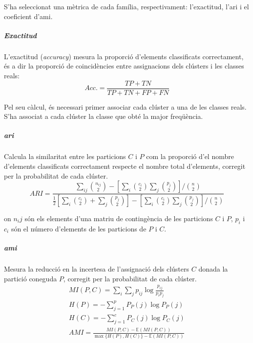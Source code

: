 \documentclass[CAT,BIB]{TFUOC}%
\begin{document}
            S'ha seleccionat una mètrica de cada família, respectivament:
            l'exactitud, l'\gls{ari} i el coeficient d'\gls{ami}.

            \subparagraph{Exactitud}
                L'exactitud (\textit{accuracy})
                mesura la proporció d'elements classificats correctament,
                és a dir la proporció de coincidències
                entre assignacions dels clústers i les classes reals:
                \begin{equation}
                \label{eq:accuracy}
                    Acc. = \frac{TP + TN}{TP + TN + FP + FN}
                \end{equation}

                Pel seu càlcul,
                és necessari primer associar cada clúster
                a una de les classes reals.
                S'ha associat a cada clúster
                la classe que obté la major freqüència.

            \subparagraph{\gls{ari}}
                Calcula la similaritat entre les particions $C$ i $P$
                com la proporció d'el nombre d'elements classificats correctament
                respecte el nombre total d'elements,
                corregit per la probabilitat de cada clúster.
                \begin{equation}
                \label{eq:rand}
                    ARI = \frac{
                              \sum_{ij} \binom{n_{ij}}{2}
                              - [\sum_{i} \binom{c_i}{2} \sum_{j} \binom{p_j}{2}]
                              / \binom{n}{2}
                          }{ \frac{1}{2}
                              [\sum_{i} \binom{c_i}{2} + \sum_{j} \binom{p_j}{2}]
                              - [\sum_{i} \binom{c_i}{2} \sum_{j} \binom{p_j}{2}]
                              / \binom{n}{2}
                          }
                \end{equation}

                on $n_ij$ són els elements d'una matriu de contingència
                de les particions $C$ i $P$,
                $p_i$ i $c_i$ són el número d'elements de les particions de $P$ i $C$.

            \subparagraph{\gls{ami}}
                Mesura la reducció en la incertesa
                de l'assignació dels clústers $C$
                donada la partició coneguda $P$,
                corregit per la probabilitat de cada clúster.
                \begin{gather}
                \label{eq:mi}
                    MI(P,C) = \sum_i \sum_j p_{ij} \log \frac{p_{ij}}{p_i p_j}
                    \\
                    H(P) = - \sum_{j=1}^p P_P(j) \log P_P(j)
                    \\
                    H(C) = - \sum_{j=1}^c P_C(j) \log P_C(j)
                    \\
                    AMI = \frac{MI(P,C) - \mathbb{E}(MI(P,C))}
                    {\max\{H(P), H(C)\} - \mathbb{E}(MI(P,C))}
                \end{gather}
\end{document}

